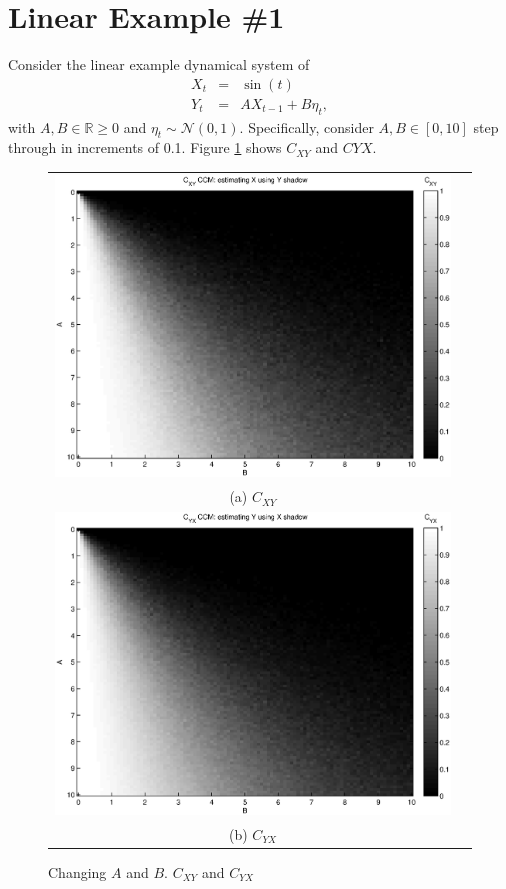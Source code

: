 \documentclass{article}
\begin{document}

\noindent\makebox[\linewidth]{\rule{\paperwidth}{0.4pt}}
\section{Linear Example \#1}
Consider the linear example dynamical system of
\begin{eqnarray}
X_t &=& \sin(t)\\
Y_t &=& AX_{t-1}+B\eta_t,
\end{eqnarray}
with $A,B\in\mathbb{R}\ge 0$ and $\eta_t\sim\mathcal{N}\left(0,1\right)$.  Specifically, consider $A,B\in[0,10]$ step through in increments of 0.1.  Figure \ref{fig1} shows $C_{XY}$ and $C{YX}$.  
\begin{center}
\begin{figure}[H]
\begin{tabular}{cc}
\includegraphics[scale=0.5]{LinearEx_CXY.eps} \\
(a) $C_{XY}$ \\[6pt]
\includegraphics[scale=0.5]{LinearEx_CYX.eps} \\
(b) $C_{YX}$ \\[6pt]
\end{tabular}
\caption{Changing $A$ and $B$.  $C_{XY}$ and $C_{YX}$}
\label{fig1}
\end{figure}
\end{center}
\end{document}
